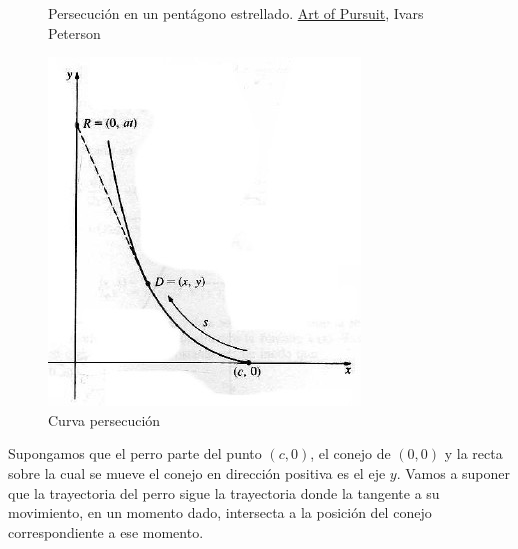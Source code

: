 \begin{figure}[h]
\begin{center}
 \caption{\small Persecución en un pentágono estrellado.
\href{https://www.sciencenews.org/article/art-pursuit-3}{Art of Pursuit},
Ivars Peterson
}
\end{center}
\end{figure}

\begin{figure}
\begin{center}
\vspace{-1cm}
 \includegraphics[scale=.3]{imagenes/persecucion.jpg}
\end{center}
\caption{Curva persecución}\label{fig:curva_per}
\end{figure}
Supongamos que el perro parte del punto $(c,0)$, el conejo de $(0,0 )$ y la recta sobre la cual se mueve el conejo en dirección positiva  es el eje $y$.
Vamos a suponer que la trayectoria del perro sigue la trayectoria donde
la tangente a su movimiento, en un momento dado, intersecta a la posición del conejo correspondiente a ese momento.


